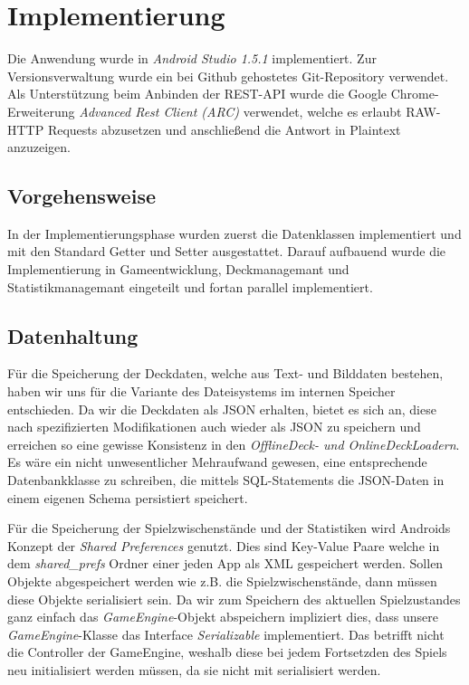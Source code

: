 \chapter{Implementierung}
\label{cha:implementierung}


Die Anwendung wurde in \emph{Android Studio 1.5.1} implementiert. Zur Versionsverwaltung wurde ein bei Github gehostetes Git-Repository verwendet. Als Unterstützung beim Anbinden der REST-API wurde die Google Chrome-Erweiterung \emph{Advanced Rest Client (ARC)} verwendet, welche es erlaubt RAW-HTTP Requests abzusetzen und anschließend die Antwort in Plaintext anzuzeigen.

\section{Vorgehensweise}
In der Implementierungsphase wurden zuerst die Datenklassen implementiert und mit den Standard Getter und Setter ausgestattet. Darauf aufbauend wurde die Implementierung in Gameentwicklung, Deckmanagemant und Statistikmanagemant eingeteilt und fortan parallel implementiert. 


\section{Datenhaltung}
Für die Speicherung der Deckdaten, welche aus Text- und Bilddaten bestehen, haben wir uns für die Variante des Dateisystems im internen Speicher entschieden. Da wir die Deckdaten als JSON erhalten, bietet es sich an, diese nach spezifizierten Modifikationen auch wieder als JSON zu speichern und erreichen so eine gewisse Konsistenz in den \emph{OfflineDeck- und OnlineDeckLoadern}. Es wäre ein nicht unwesentlicher Mehraufwand gewesen, eine entsprechende Datenbankklasse zu schreiben, die mittels SQL-Statements die JSON-Daten in einem eigenen Schema persistiert speichert. 

Für die Speicherung der Spielzwischenstände und der Statistiken wird Androids Konzept der \emph{Shared Preferences} genutzt. Dies sind Key-Value Paare welche in dem \emph{shared\_prefs} Ordner einer jeden App als XML gespeichert werden. Sollen Objekte abgespeichert werden wie z.B. die Spielzwischenstände, dann müssen diese Objekte serialisiert sein. Da wir zum Speichern des aktuellen Spielzustandes ganz einfach das \emph{GameEngine}-Objekt abspeichern impliziert dies, dass unsere \emph{GameEngine}-Klasse das Interface \emph{Serializable} implementiert. Das betrifft nicht die Controller der GameEngine, weshalb diese bei jedem Fortsetzden des Spiels neu initialisiert werden müssen, da sie nicht mit serialisiert werden.

